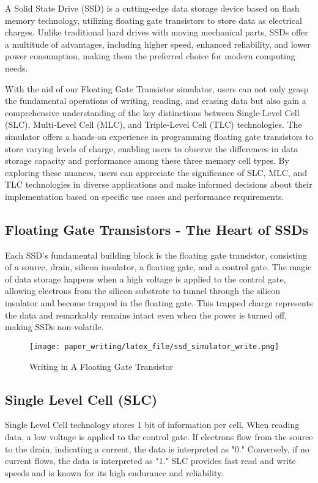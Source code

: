 \documentclass[conference]{/home/habib/Desktop/flash_ssd_simulator_web/paper_writing/latex_file/IEEEtran}
\begin{document}
A Solid State Drive (SSD) is a cutting-edge data storage device based on flash memory technology, utilizing floating gate transistors to store data as electrical charges. Unlike traditional hard drives with moving mechanical parts, SSDs offer a multitude of advantages, including higher speed, enhanced reliability, and lower power consumption, making them the preferred choice for modern computing needs.

With the aid of our Floating Gate Transistor simulator, users can not only grasp the fundamental operations of writing, reading, and erasing data but also gain a comprehensive understanding of the key distinctions between Single-Level Cell (SLC), Multi-Level Cell (MLC), and Triple-Level Cell (TLC) technologies. The simulator offers a hands-on experience in programming floating gate transistors to store varying levels of charge, enabling users to observe the differences in data storage capacity and performance among these three memory cell types. By exploring these nuances, users can appreciate the significance of SLC, MLC, and TLC technologies in diverse applications and make informed decisions about their implementation based on specific use cases and performance requirements.

\subsection{Floating Gate Transistors - The Heart of SSDs}
Each SSD's fundamental building block is the floating gate transistor, consisting of a source, drain, silicon insulator, a floating gate, and a control gate. The magic of data storage happens when a high voltage is applied to the control gate, allowing electrons from the silicon substrate to tunnel through the silicon insulator and become trapped in the floating gate. This trapped charge represents the data and remarkably remains intact even when the power is turned off, making SSDs non-volatile.
\begin{figure}[h]
    \centering
    \texttt{[image: paper\_writing/latex\_file/ssd\_simulator\_write.png]}
    \caption{Writing in A Floating Gate Transistor}
    \label{fig:ssd_simulator_write}
\end{figure}
\subsection{Single Level Cell (SLC)}
Single Level Cell technology stores 1 bit of information per cell. When reading data, a low voltage is applied to the control gate. If electrons flow from the source to the drain, indicating a current, the data is interpreted as "0." Conversely, if no current flows, the data is interpreted as "1." SLC provides fast read and write speeds and is known for its high endurance and reliability.
\end{document}
